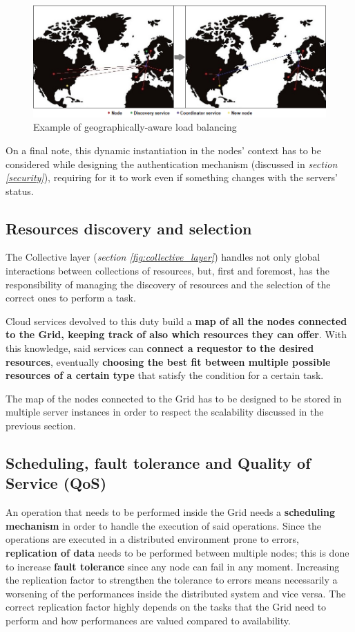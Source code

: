 \begin{figure}[!ht]
    \centering
    \includegraphics[width=\textwidth]{document/chapters/chapter_2/images/server_instantiation.png}
    \caption{Example of geographically-aware load balancing}
    \label{fig:server_instantiation}
\end{figure}

On a final note, this dynamic instantiation in the nodes' context has to be considered while designing the authentication mechanism (discussed in \textit{section \ref{security}}), requiring for it to work even if something changes with the servers' status.


\subsection{Resources discovery and selection}\label{resources_discovery_and_selection}
The Collective layer (\textit{section \ref{fig:collective_layer}}) handles not only global interactions between collections of resources, but, first and foremost, has the responsibility of managing the discovery of resources and the selection of the correct ones to perform a task.

Cloud services devolved to this duty build a \textbf{map of all the nodes connected to the Grid, keeping track of also which resources they can offer}. With this knowledge, said services can \textbf{connect a requestor to the desired resources}, eventually \textbf{choosing the best fit between multiple possible resources of a certain type} that satisfy the condition for a certain task.

The map of the nodes connected to the Grid has to be designed to be stored in multiple server instances in order to respect the scalability discussed in the previous section.

\subsection{Scheduling, fault tolerance and Quality of Service (QoS)}
An operation that needs to be performed inside the Grid needs a \textbf{scheduling mechanism} in order to handle the execution of said operations. Since the operations are executed in a distributed environment prone to errors, \textbf{replication of data} needs to be performed between multiple nodes; this is done to increase \textbf{fault tolerance} since any node can fail in any moment. Increasing the replication factor to strengthen the tolerance to errors means necessarily a worsening of the performances inside the distributed system and vice versa. The correct replication factor highly depends on the tasks that the Grid need to perform and how performances are valued compared to availability.


